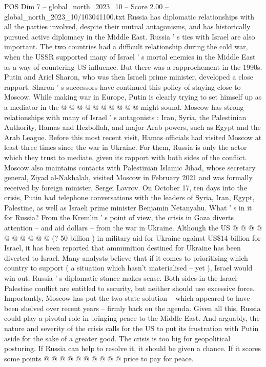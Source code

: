 \begin{textsample}{POS Dim 7 – global\_north\_2023\_10 – Score 2.00 – global\_north\_2023\_10/103041100.txt}
Russia has diplomatic relationships with all the parties involved, despite their mutual antagonisms, and has historically pursued active diplomacy in the Middle East.
Russia ' s ties with Israel are also important.
The two countries had a difficult relationship during the cold war, when the USSR supported many of Israel ' s mortal enemies in the Middle East as a way of countering US influence.
But there was a rapprochement in the 1990s.
Putin and Ariel Sharon, who was then Israeli prime minister, developed a close rapport.
Sharon ' s successors have continued this policy of staying close to Moscow.
While making war in Europe, Putin is clearly trying to set himself up as a mediator in the @ @ @ @ @ @ @ @ @ @ might sound.
Moscow has strong relationships with many of Israel ' s antagonists : Iran, Syria, the Palestinian Authority, Hamas and Hezbollah, and major Arab powers, such as Egypt and the Arab League.
Before this most recent visit, Hamas officials had visited Moscow at least three times since the war in Ukraine.
For them, Russia is only the actor which they trust to mediate, given its rapport with both sides of the conflict.
Moscow also maintains contacts with Palestinian Islamic Jihad, whose secretary general, Ziyad al-Nakhalah, visited Moscow in February 2021 and was formally received by foreign minister, Sergei Lavrov.
On October 17, ten days into the crisis, Putin had telephone conversations with the leaders of Syria, Iran, Egypt, Palestine, as well as Israeli prime minister Benjamin Netanyahu.
What ' s in it for Russia?
From the Kremlin ' s point of view, the crisis in Gaza diverts attention -- and aid dollars -- from the war in Ukraine.
Although the US @ @ @ @ @ @ @ @ @ @ (? 50 billion ) in military aid for Ukraine against US\$14 billion for Israel, it has been reported that ammunition destined for Ukraine has been diverted to Israel.
Many analysts believe that if it comes to prioritising which country to support ( a situation which hasn't materialised -- yet ), Israel would win out.
Russia ' s diplomatic stance makes sense.
Both sides in the Israel-Palestine conflict are entitled to security, but neither should use excessive force.
Importantly, Moscow has put the two-state solution -- which appeared to have been shelved over recent years -- firmly back on the agenda.
Given all this, Russia could play a pivotal role in bringing peace to the Middle East.
And arguably, the nature and severity of the crisis calls for the US to put its frustration with Putin aside for the sake of a greater good.
The crisis is too big for geopolitical posturing.
If Russia can help to resolve it, it should be given a chance.
If it scores some points @ @ @ @ @ @ @ @ @ @ price to pay for peace.

\end{textsample}
